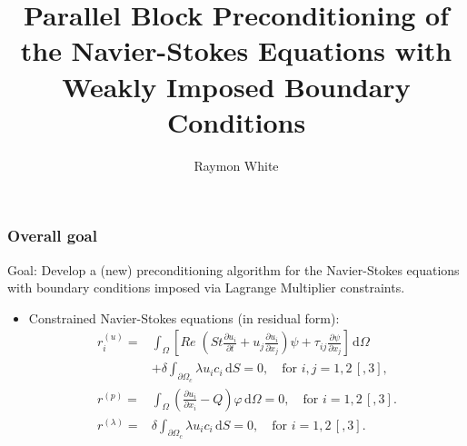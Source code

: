 \documentclass{beamer}
\title{Parallel Block Preconditioning of the Navier-Stokes Equations with
  Weakly Imposed Boundary Conditions}
\author{Raymon White}
\begin{document}
\begin{frame}
  \titlepage
\end{frame}



\newcommand{\vsol}{\psi}
\newcommand{\ijdim}{\text{for } i,j = 1,2\,[,3]}
\newcommand{\psol}{\varphi}
\newcommand{\idim}{\text{for } i = 1,2\,[,3]}

\begin{frame} \frametitle{Overall goal}
Goal: Develop a (new) preconditioning algorithm for the
      Navier-Stokes equations with boundary conditions imposed via Lagrange 
      Multiplier constraints.

\begin{itemize}%
\item Constrained Navier-Stokes equations (in residual form):
\begin{align}
	r_{i}^{(u)}=&\int_\Omega \left[ Re\; \left( St\frac{\partial u_i}{\partial t}+ u_j \frac{\partial
    u_i}{\partial x_j} \right)    \vsol{} + \tau_{ij}\frac{\partial
  \vsol{}}{\partial x_j} \right]  \,\mathrm{d}\Omega \nonumber\\
   	& + \delta \int_{\partial \Omega_c} \lambda u_i c_i \,\mathrm{d}S = 0,
    \quad \ijdim,	\label{eq:nsweakform_stated2} \\
r^{(p)}=&\int_{\Omega}\left( \frac{\partial u_i}{\partial x_i} - Q
\right)\psol{}	\,\mathrm{d}\Omega = 0, \quad \idim.
\label{eq:continweakform_stated2} \\
 r^{(\lambda)} = &\delta \int_{\partial \Omega_c} \lambda u_i c_i
 \,\mathrm{d}S = 0,  \quad \idim.\label{eq:lgrweakform} 
\end{align}
\end{itemize}
\end{frame}
\end{document}
